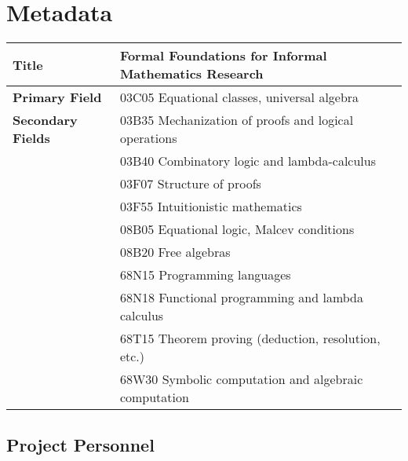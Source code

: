 \documentclass[11pt]{amsart}  %
\begin{document}
\newpage


\appendix

\section{Metadata}



\begin{table}[h]
  \begin{tabular}{|l|l|}
  \hline
  {\bf Title} & Formal Foundations for Informal Mathematics Research \\
  \hline
  {\bf Primary Field} & 03C05 Equational classes, universal algebra\\ %
  \hline
  {\bf Secondary Fields} & 
  03B35 Mechanization of proofs and logical operations\\ %
  & 03B40 Combinatory logic and lambda-calculus\\ %
  & 03F07  Structure of proofs\\
  & 03F55  Intuitionistic mathematics\\
  & 08B05 Equational logic, Malcev conditions\\
  & 08B20  Free algebras\\
  & 68N15  Programming languages\\
  & 68N18  Functional programming and lambda calculus \\ %
  & 68T15  Theorem proving (deduction, resolution, etc.)\\
  & 68W30  Symbolic computation and algebraic computation\\
  \hline
  \end{tabular}
  \end{table}
  




\subsection{Project Personnel}\
\vskip5mm
\end{document}
